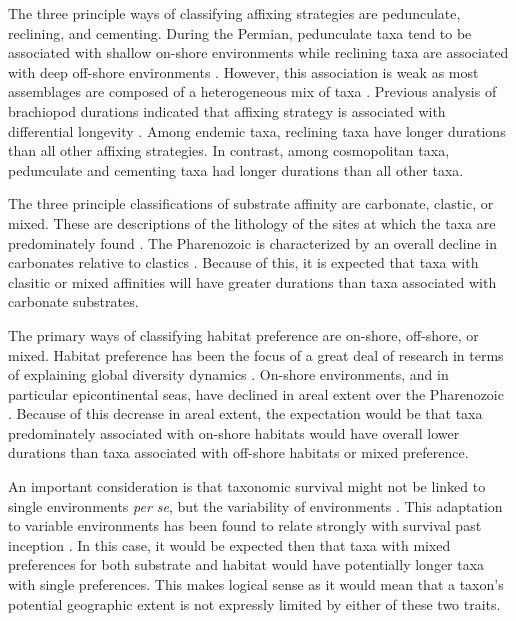 \documentclass[12pt,letterpaper]{article}
\begin{document}
The three principle ways of classifying affixing strategies are pedunculate, reclining, and cementing. During the Permian, pedunculate taxa tend to be associated with shallow on-shore environments while reclining taxa are associated with deep off-shore environments \citep{Clapham2007}. However, this association is weak as most assemblages are composed of a heterogeneous mix of taxa \citep{Clapham2007}. Previous analysis of brachiopod durations indicated that affixing strategy is associated with differential longevity \citep{Alexander1977}. Among endemic taxa, reclining taxa have longer durations than all other affixing strategies. In contrast, among cosmopolitan taxa, pedunculate and cementing taxa had longer durations than all other taxa. 

The three principle classifications of substrate affinity are carbonate, clastic, or mixed. These are descriptions of the lithology of the sites at which the taxa are predominately found \citep{Foote2006,Anderson2011a,Nurnberg2013a,Kiessling2007a,Miller2001}. The Pharenozoic is characterized by an overall decline in carbonates relative to clastics \citep{Foote2006,Miller2001}. Because of this, it is expected that taxa with clasitic or mixed affinities will have greater durations than taxa associated with carbonate substrates. %

The primary ways of classifying habitat preference are on-shore, off-shore, or mixed. Habitat preference has been the focus of a great deal of research in terms of explaining global diversity dynamics \citep{Sepkoski1991,Kiessling2007a,Bottjer1988,Jablonski1991,Jablonski1983b}. On-shore environments, and in particular epicontinental seas, have declined in areal extent over the Pharenozoic \citep{Peters2008}. Because of this decrease in areal extent, the expectation would be that taxa predominately associated with on-shore habitats would have overall lower durations than taxa associated with off-shore habitats or mixed preference.

An important consideration is that taxonomic survival might not be linked to single environments \textit{per se}, but the variability of environments \citep{Foote2013,Heim2011,Liow2007b}. This adaptation to variable environments has been found to relate strongly with survival past inception \citep{Foote2013}. In this case, it would be expected then that taxa with mixed preferences for both substrate and habitat would have potentially longer taxa with single preferences. This makes logical sense as it would mean that a taxon's potential geographic extent is not expressly limited by either of these two traits. 
\end{document}
